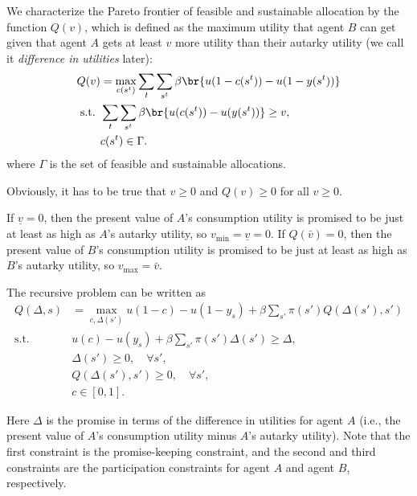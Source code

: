 We characterize the Pareto frontier of feasible and sustainable allocation by the function $Q(v)$, which is defined as the maximum utility that agent $B$ can get given that agent $A$ gets at least $v$ more utility than their autarky utility (we call it \textit{difference in utilities} later):
\[
\begin{aligned}
    Q(v) & = \max_{c(s^t)}\sum_t\sum_{s^t}\beta \br{u(1-c(s^t))-u(1-y(s^t))} \\
    \text{s.t. } & \sum_t\sum_{s^t}\beta \br{u(c(s^t))-u(y(s^t))} \ge v,\\  
    & c(s^t)\in \Gamma.
\end{aligned}
\]
where $\Gamma$ is the set of feasible and sustainable allocations.

Obviously, it has to be true that $v\ge 0$ and $Q(v)\ge 0$ for all $v\ge 0$.

If $\underline{v} = 0$, then the present value of $A$'s consumption utility is promised to be just at least as high as $A$'s autarky utility, so $v_{\min} = \underline v = 0$. If $Q(\bar v) = 0$, then the present value of $B$'s consumption utility is promised to be just at least as high as $B$'s autarky utility, so $v_{\max} = \bar v$.

The recursive problem can be written as
\[
\begin{aligned}
    Q(\Delta, s) & = \max_{c,\Delta(s')} u(1-c)-u(1-y_s)+\beta\sum_{s'}\pi(s')Q(\Delta(s'),s')\\
\text{s.t. } & u(c)-u(y_s)+\beta\sum_{s'}\pi(s')\Delta(s') \ge \Delta,\\
& \Delta(s')\ge 0,\quad \forall s',\\
& Q(\Delta(s'),s')\ge 0,\quad \forall s',\\
& c\in [0,1].
\end{aligned}
\]

Here $\Delta$ is the promise in terms of the difference in utilities for agent $A$ (i.e., the present value of $A$'s consumption utility minus $A$'s autarky utility). Note that the first constraint is the promise-keeping constraint, and the second and third constraints are the participation constraints for agent $A$ and agent $B$, respectively.


